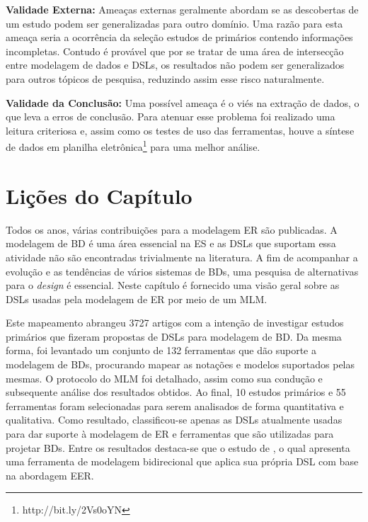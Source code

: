 \textbf{Validade Externa:}
Ameaças externas geralmente abordam se as descobertas de um estudo podem ser generalizadas para outro domínio. 
Uma razão para esta ameaça seria a ocorrência da seleção estudos de primários contendo informações incompletas. 
Contudo é provável que por se tratar de uma área de intersecção entre modelagem de dados e \acp{DSL}, os resultados não podem ser generalizados para outros tópicos de pesquisa, reduzindo assim esse risco naturalmente.

\textbf{Validade da Conclusão:}
Uma possível ameaça é o viés na extração de dados, o que leva a erros de conclusão.
Para atenuar esse problema foi realizado uma leitura criteriosa e, assim como os testes de uso das ferramentas, houve a síntese de dados em planilha eletrônica\footnote{http://bit.ly/2Vs0oYN} para uma melhor análise.

\section{Lições do Capítulo} \label{sec:LicoesMapeamento}

Todos os anos, várias contribuições para a modelagem \ac{ER} são publicadas. 
A modelagem de \ac{BD} é uma área essencial na \ac{ES} e as \acp{DSL} que suportam essa atividade não são encontradas trivialmente na literatura.
A fim de acompanhar a evolução e as tendências de vários sistemas de \acp{BD}, uma pesquisa de alternativas para o \textit{design} é essencial. 
Neste capítulo é fornecido uma visão geral sobre as \acp{DSL} usadas pela modelagem de \ac{ER} por meio de um \ac{MLM}.


Este mapeamento abrangeu 3727 artigos com a intenção de investigar estudos primários que fizeram propostas de \acp{DSL} para modelagem de \ac{BD}. 
Da mesma forma, foi levantado um conjunto de 132 ferramentas que dão suporte a modelagem de \acp{BD}, procurando mapear as notações e modelos suportados pelas mesmas.
O protocolo do \ac{MLM} foi detalhado, assim como sua condução e subsequente análise dos resultados obtidos.
Ao final, 10 estudos primários e 55 ferramentas foram selecionadas para serem analisados de forma quantitativa e qualitativa. 
Como resultado, classificou-se apenas as \acp{DSL} atualmente usadas para dar suporte à modelagem de \ac{ER} e ferramentas que são utilizadas para projetar \acp{BD}.
Entre os resultados destaca-se que o estudo de , o qual apresenta uma ferramenta de modelagem bidirecional que aplica sua própria \ac{DSL} com base na abordagem \ac{EER}.

